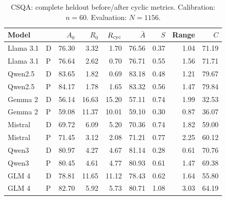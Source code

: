 \begin{table}[H]
\centering\small\setlength{\tabcolsep}{5pt}
\caption{CSQA: complete heldout before/after cyclic metrics. Calibration: $n=60$. Evaluation: $N=1156$.}\label{tab:corrected-csqa}
\begin{tabular}{llrrrrrrr}
\toprule
Model &  & $A_0$ & $R_0$ & $R_{\rm cyc}$ & $\bar A$ & $S$ & Range & $C$\\
\midrule
Llama 3.1 & D & 76.30 & 3.32 & 1.70 & 76.56 & 0.37 & 1.04 & 71.19\\
Llama 3.1 & P & 76.64 & 2.62 & 0.70 & 76.71 & 0.55 & 1.56 & 71.71\\
Qwen2.5 & D & 83.65 & 1.82 & 0.69 & 83.18 & 0.48 & 1.21 & 79.67\\
Qwen2.5 & P & 84.17 & 1.78 & 1.65 & 83.32 & 0.56 & 1.47 & 79.84\\
Gemma 2 & D & 56.14 & 16.63 & 15.20 & 57.11 & 0.74 & 1.99 & 32.53\\
Gemma 2 & P & 59.08 & 11.37 & 10.01 & 59.10 & 0.30 & 0.87 & 36.07\\
Mistral & D & 69.72 & 6.09 & 5.20 & 70.36 & 0.74 & 1.82 & 59.00\\
Mistral & P & 71.45 & 3.12 & 2.08 & 71.21 & 0.77 & 2.25 & 60.12\\
Qwen3 & D & 80.97 & 4.27 & 4.67 & 81.14 & 0.28 & 0.61 & 70.76\\
Qwen3 & P & 80.45 & 4.61 & 4.77 & 80.93 & 0.61 & 1.47 & 69.38\\
GLM 4 & D & 78.81 & 11.65 & 11.12 & 78.43 & 0.62 & 1.64 & 55.80\\
GLM 4 & P & 82.70 & 5.92 & 5.73 & 80.71 & 1.08 & 3.03 & 64.19\\
\bottomrule
\end{tabular}
\end{table}


